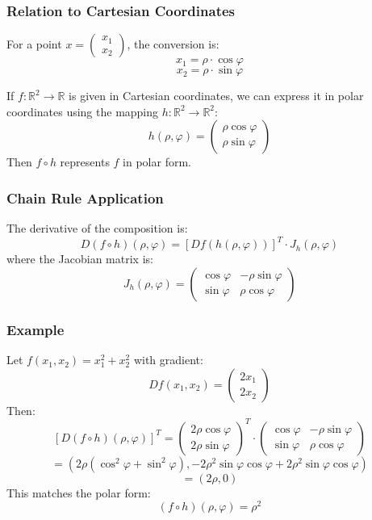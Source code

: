 \documentclass{article}
\begin{document}
\subsubsection{Relation to Cartesian Coordinates}
For a point $x = \begin{pmatrix} x_1 \\ x_2 \end{pmatrix}$, the conversion is:
\[
x_1 = \rho \cdot \cos\varphi
\]
\[
x_2 = \rho \cdot \sin\varphi
\]

If $f: \mathbb{R}^2 \to \mathbb{R}$ is given in Cartesian coordinates, we can express it in polar coordinates using the mapping $h:\mathbb{R}^2 \to \mathbb{R}^2$:
\[
h(\rho, \varphi) = 
\begin{pmatrix}
\rho \cos \varphi \\
\rho \sin \varphi
\end{pmatrix} 
\]
Then $f \circ h$ represents $f$ in polar form.

\subsubsection{Chain Rule Application}
The derivative of the composition is:
\[
D(f \circ h)(\rho, \varphi) = [Df(h(\rho, \varphi))]^T \cdot J_h(\rho, \varphi)
\]
where the Jacobian matrix is:
\[
J_h(\rho, \varphi) = 
\begin{pmatrix}
\cos \varphi & -\rho \sin \varphi \\
\sin \varphi & \rho \cos \varphi
\end{pmatrix}
\]

\subsubsection{Example}
Let $f(x_1, x_2) = x_1^2 + x_2^2$ with gradient:
\[
Df(x_1, x_2) =
\begin{pmatrix}
2x_1 \\
2x_2
\end{pmatrix}
\]
Then:
\[
[D(f \circ h)(\rho, \varphi)]^T = 
\begin{pmatrix}
2\rho \cos \varphi \\
2\rho \sin \varphi
\end{pmatrix}^T 
\cdot 
\begin{pmatrix}
\cos \varphi & -\rho \sin \varphi \\
\sin \varphi & \rho \cos \varphi
\end{pmatrix}
\]
\[
= \left(2\rho (\cos^2 \varphi + \sin^2 \varphi), -2\rho^2 \sin \varphi \cos \varphi + 2\rho^2 \sin \varphi \cos \varphi\right)
\]
\[
= (2\rho, 0)
\]
This matches the polar form:
\[
(f \circ h)(\rho, \varphi) = \rho^2
\]
\end{document}
